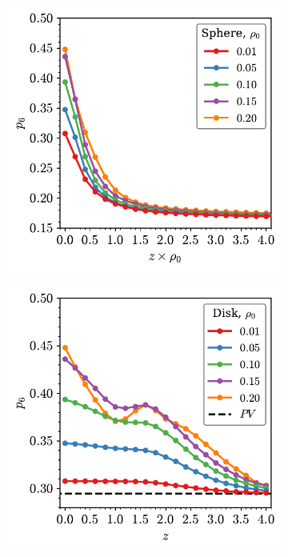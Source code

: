 \begin{figure}

	\begin{subfigure}[b]{0.48\textwidth}
         \centering
         \includegraphics[width=\textwidth]{./figures/quasi2d/p6_z_3d_sphere.pdf}
         \caption{}
         \label{fig:nphia}
     \end{subfigure}
     \hfill
     \begin{subfigure}[b]{0.48\textwidth}
         \centering
         \includegraphics[width=\textwidth]{./figures/quasi2d/p6_z_3d_disk.pdf}
         \caption{}
         \label{fig:nphib}
     \end{subfigure}
     \hfill
     

\end{figure}
